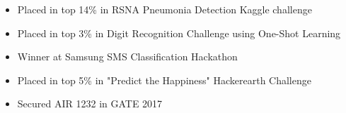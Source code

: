\documentclass[10pt,a4paper,ragged2e]{altacv}
\begin{document}
\iffalse
\smallskip
\begin{itemize}
\item Placed in top 14\% in RSNA Pneumonia Detection Kaggle challenge
\smallskip
\item Placed in top 3\% in Digit Recognition Challenge using One-Shot Learning
\smallskip
\item Winner at Samsung SMS Classification Hackathon
\smallskip
\item Placed in top 5\% in "Predict the Happiness" Hackerearth Challenge
\smallskip
\item Secured AIR 1232 in GATE 2017
\end{itemize}


{}



{}




\end{document}
